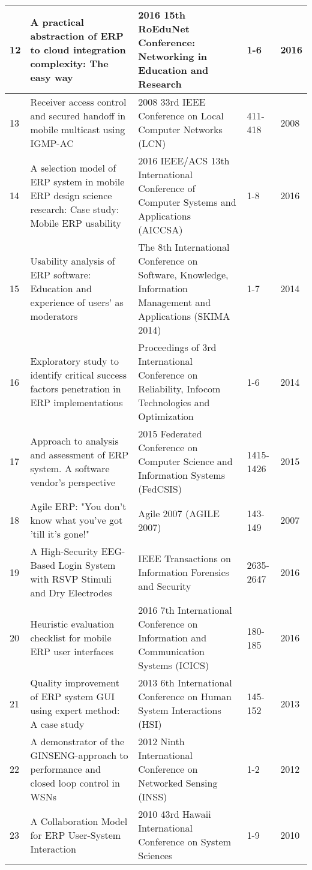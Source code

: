 \begin{landscape}
\begin{longtable}{||p{1.7cm}|p{11.0cm}|p{7.0cm}|p{1.7cm}|p{1cm}||}
	\hline
	12 & A practical abstraction of ERP to cloud integration complexity: The easy way & 2016 15th RoEduNet Conference: Networking in Education and Research & 1-6 & 2016 \\ 
	\hline
	13 & Receiver access control and secured handoff in mobile multicast using IGMP-AC & 2008 33rd IEEE Conference on Local Computer Networks (LCN) & 411-418 & 2008 \\ 
	\hline
	14 & A selection model of ERP system in mobile ERP design science research: Case study: Mobile ERP usability & 2016 IEEE/ACS 13th International Conference of Computer Systems and Applications (AICCSA) & 1-8 & 2016 \\ 
	\hline
	15 & Usability analysis of ERP software: Education and experience of users' as moderators & The 8th International Conference on Software, Knowledge, Information Management and Applications (SKIMA 2014) & 1-7 & 2014 \\ 
	\hline
	16 & Exploratory study to identify critical success factors penetration in ERP implementations & Proceedings of 3rd International Conference on Reliability, Infocom Technologies and Optimization & 1-6 & 2014 \\ 
	\hline
	17 & Approach to analysis and assessment of ERP system. A software vendor's perspective & 2015 Federated Conference on Computer Science and Information Systems (FedCSIS) & 1415-1426 & 2015 \\ 
	\hline
	18 & Agile ERP: "You don't know what you've got 'till it's gone!" & Agile 2007 (AGILE 2007) & 143-149 & 2007 \\ 
	\hline
	19 & A High-Security EEG-Based Login System with RSVP Stimuli and Dry Electrodes & IEEE Transactions on Information Forensics and Security & 2635-2647 & 2016 \\ 
	\hline
	20 & Heuristic evaluation checklist for mobile ERP user interfaces & 2016 7th International Conference on Information and Communication Systems (ICICS) & 180-185 & 2016 \\ 
	\hline
	21 & Quality improvement of ERP system GUI using expert method: A case study & 2013 6th International Conference on Human System Interactions (HSI) & 145-152 & 2013 \\ 
	\hline
	22 & A demonstrator of the GINSENG-approach to performance and closed loop control in WSNs & 2012 Ninth International Conference on Networked Sensing (INSS) & 1-2 & 2012 \\ 
	\hline
	23 & A Collaboration Model for ERP User-System Interaction & 2010 43rd Hawaii International Conference on System Sciences & 1-9 & 2010 \\ 

\end{longtable}
\end{landscape}
